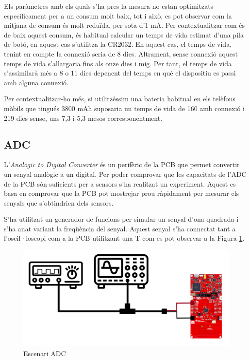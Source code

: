Els paràmetres amb els quals s'ha pres la mesura no estan optimitzats específicament per a un consum molt baix, tot i això, es pot observar com la mitjana de consum és molt reduïda, per sota d'1 mA.
Per contextualitzar com és de baix aquest consum, és habitual calcular un temps de vida estimat d'una pila de botó, en aquest cas s'utilitza la CR2032.
En aquest cas, el temps de vida, tenint en compte la connexió seria de 8 dies.
Altrament, sense connexió aquest temps de vida s'allargaria fins als onze dies i mig.
Per tant, el temps de vida s'assimilarà més a 8 o 11 dies depenent del temps en què el dispositiu es passi amb alguna connexió.

Per contextualitzar-ho més, si utilitzéssim una bateria habitual en els telèfons mòbils que tingués 3800 mAh suposaria un temps de vida de 160 amb connexió i 219 dies sense, uns 7,3 i 5,3 mesos corresponentment.


\subsection{ADC}
L'\textit{Analogic to Digital Converter} és un perifèric de la PCB que permet convertir un senyal analògic a un digital.
Per poder comprovar que les capacitats de l'ADC de la PCB són suficients per a sensors s'ha realitzat un experiment.
Aquest es basa en comprovar que la PCB pot mostrejar prou ràpidament per mesurar els senyals que s'obtindrien dels sensors.

S'ha utilitzat un generador de funcions per simular un senyal d'ona quadrada i s'ha anat variant la freqüència del senyal. Aquest senyal s'ha connectat tant a l'oscil·loscopi com a la PCB utilitzant una T com es pot observar a la Figura \ref{lab}.

\begin{figure}[!h]
	\begin{center}
		\includegraphics[width=\textwidth]{./images/CicrcuitoExperimentoLab2.png}
		\caption{Escenari ADC}
		\label{lab}
	\end{center}
\end{figure}


